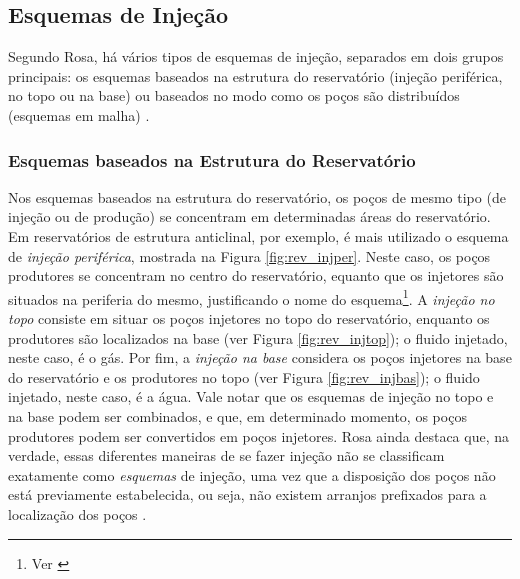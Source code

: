 \subsection{Esquemas de Inje\c{c}\~{a}o}
Segundo Rosa, h\'{a} v\'{a}rios tipos de esquemas de inje\c{c}\~{a}o, separados em dois grupos principais: os esquemas baseados na estrutura do reservat\'{o}rio (inje\c{c}\~{a}o perif\'{e}rica, no topo ou na base) ou baseados no modo como os po\c{c}os s\~{a}o distribu\'{i}dos (esquemas em malha) \cite[p. 564]{engres}.

\subsubsection{Esquemas baseados na Estrutura do Reservat\'{o}rio}
Nos esquemas baseados na estrutura do reservat\'{o}rio, os po\c{c}os de mesmo tipo (de inje\c{c}\~{a}o ou de produ\c{c}\~{a}o) se concentram em determinadas \'{a}reas do reservat\'{o}rio. Em reservat\'{o}rios de estrutura anticlinal, por exemplo, \'{e} mais utilizado o esquema de \textit{inje\c{c}\~{a}o perif\'{e}rica}, mostrada na Figura \ref{fig:rev_injper}. Neste caso, os po\c{c}os produtores se concentram no centro do reservat\'{o}rio, equanto que os injetores s\~{a}o situados na periferia do mesmo, justificando o nome do esquema\footnote{Ver \cite[p. 565]{engres}}. A \textit{inje\c{c}\~{a}o no topo} consiste em situar os po\c{c}os injetores no topo do reservat\'{o}rio, enquanto os produtores s\~{a}o localizados na base (ver Figura \ref{fig:rev_injtop}); o fluido injetado, neste caso, \'{e} o g\'{a}s. Por fim, a \textit{inje\c{c}\~{a}o na base} considera os po\c{c}os injetores na base do reservat\'{o}rio e os produtores no topo (ver Figura \ref{fig:rev_injbas}); o fluido injetado, neste caso, \'{e} a \'{a}gua. Vale notar que os esquemas de inje\c{c}\~{a}o no topo e na base podem ser combinados, e que, em determinado momento, os po\c{c}os produtores podem ser convertidos em po\c{c}os injetores. Rosa ainda destaca que, na verdade, essas diferentes maneiras de se fazer inje\c{c}\~{a}o n\~{a}o se classificam exatamente como
\textit{esquemas} de inje\c{c}\~{a}o, uma vez que a disposi\c{c}\~{a}o dos po\c{c}os n\~{a}o est\'{a} previamente estabelecida, ou seja, n\~{a}o existem arranjos prefixados para a localiza\c{c}\~{a}o dos po\c{c}os \cite[p. 566]{engres}.

